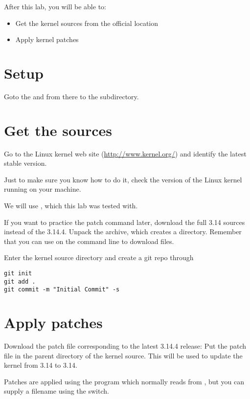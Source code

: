 
After this lab, you will be able to:
\begin{itemize}
\item Get the kernel sources from the official location
\item Apply kernel patches
\end{itemize}

\section{Setup}

Goto the \labdir and from there to the  subdirectory.

\section{Get the sources}

Go to the Linux kernel web site (\url{http://www.kernel.org/}) and
identify the latest stable version.

Just to make sure you know how to do it, check the version of the
Linux kernel running on your machine.

We will use , which this lab was tested with.

If you want to practice the patch command later, download the full 3.14
sources instead of the 3.14.4. Unpack the archive, which creates a 
directory. Remember that you can use  on the command
line to download files.

Enter the kernel source directory and create a git repo through

\begin{verbatim}
git init
git add .
git commit -m "Initial Commit" -s
\end{verbatim}
\clearpage
\section{Apply patches}

Download the patch file corresponding to the latest 3.14.4 release:
Put the patch file in the parent directory of the kernel source.
This will be used to update the kernel from 3.14 to 3.14.

Patches are applied using the  program which normally reads from ,
but you can supply a filename using the  switch.

